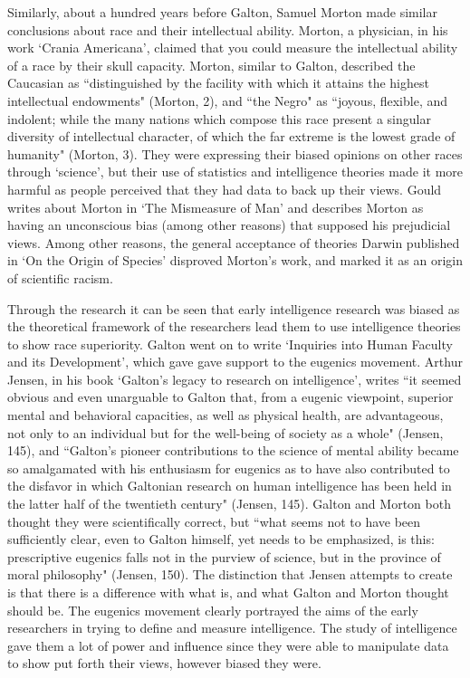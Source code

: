 \documentclass[11pt, oneside]{article}
\begin{document}
\par Similarly, about a hundred years before Galton, Samuel Morton made similar conclusions about race and their intellectual ability. Morton, a physician, in his work `Crania Americana', claimed that you could measure the intellectual ability of a race by their skull capacity. Morton, similar to Galton, described the Caucasian as ``distinguished by the facility with which it attains the highest intellectual endowments" (Morton, 2), and ``the Negro" as ``joyous, flexible, and indolent; while the many nations which compose this race present a singular diversity of intellectual character, of which the far extreme is the lowest grade of humanity" (Morton, 3). They were expressing their biased opinions on other races through `science', but their use of statistics and intelligence theories made it more harmful as people perceived that they had data to back up their views. Gould writes about Morton in `The Mismeasure of Man' and describes Morton as having an unconscious bias (among other reasons) that supposed his prejudicial views. Among other reasons, the general acceptance of theories Darwin published in `On the Origin of Species' disproved Morton's work, and marked it as an origin of scientific racism.

\par Through the research it can be seen that early intelligence research was biased as the theoretical framework of the researchers lead them to use intelligence theories to show race superiority. Galton went on to write `Inquiries into Human Faculty and its Development', which gave gave support to the eugenics movement. Arthur Jensen, in his book `Galton's legacy to research on intelligence', writes ``it seemed obvious and even unarguable to Galton that, from a eugenic viewpoint, superior mental and behavioral capacities, as well as physical health, are advantageous, not only to an individual but for the well-being of society as a whole" (Jensen, 145), and ``Galton's pioneer contributions to the science of mental ability became so amalgamated with his enthusiasm for eugenics as to have also contributed to the disfavor in which Galtonian research on human intelligence has been held in the latter half of the twentieth century" (Jensen, 145). Galton and Morton both thought they were scientifically correct, but ``what seems not to have been sufficiently clear, even to Galton himself, yet needs to be emphasized, is this: prescriptive eugenics falls not in the purview of science, but in the province of moral philosophy" (Jensen, 150). The distinction that Jensen attempts to create is that there is a difference with what is, and what Galton and Morton thought should be. The eugenics movement clearly portrayed the aims of the early researchers in trying to define and measure intelligence. The study of intelligence gave them a lot of power and influence since they were able to manipulate data to show put forth their views, however biased they were.
\end{document}
